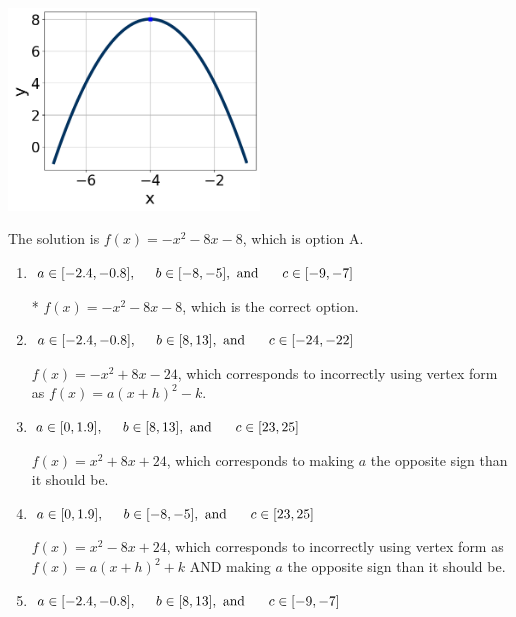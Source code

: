 \documentclass{extbook}[14pt]
\begin{document}
\begin{enumerate}
{\begin{center}
    \includegraphics[width=0.5\textwidth]{../Figures/quadraticGraphToEquationA.png}
\end{center}


The solution is \( f(x) = -x^{2} -8 x -8 \), which is option A.\begin{enumerate}[label=\Alph*.]
\item \( a \in [-2.4, -0.8], \hspace*{5mm} b \in [-8, -5], \text{ and } \hspace*{5mm} c \in [-9, -7] \)

* $f(x)=-x^{2} -8 x -8$, which is the correct option.
\item \( a \in [-2.4, -0.8], \hspace*{5mm} b \in [8, 13], \text{ and } \hspace*{5mm} c \in [-24, -22] \)

$f(x)=-x^{2} +8 x -24$, which corresponds to incorrectly using vertex form as $f(x) = a(x+h)^2 - k$.
\item \( a \in [0, 1.9], \hspace*{5mm} b \in [8, 13], \text{ and } \hspace*{5mm} c \in [23, 25] \)

$f(x)=x^{2} +8 x + 24$, which corresponds to making $a$ the opposite sign than it should be.
\item \( a \in [0, 1.9], \hspace*{5mm} b \in [-8, -5], \text{ and } \hspace*{5mm} c \in [23, 25] \)

$f(x)=x^{2} -8 x + 24$, which corresponds to incorrectly using vertex form as $f(x) = a(x+h)^2+k$ AND making $a$ the opposite sign than it should be.
\item \( a \in [-2.4, -0.8], \hspace*{5mm} b \in [8, 13], \text{ and } \hspace*{5mm} c \in [-9, -7] \)


\end{enumerate}}
\end{enumerate}
\end{document}
